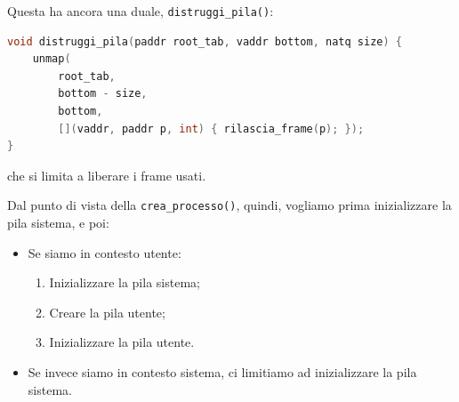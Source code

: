 \documentclass[a4paper,11pt]{article}
\begin{document}
Questa ha ancora una duale, \lstinline|distruggi_pila()|:
\begin{lstlisting}[language=C++, style=codestyle]	
void distruggi_pila(paddr root_tab, vaddr bottom, natq size) {
	unmap(
		root_tab,
		bottom - size,
		bottom,
		[](vaddr, paddr p, int) { rilascia_frame(p); });
}
\end{lstlisting}
che si limita a liberare i frame usati.

Dal punto di vista della \lstinline|crea_processo()|, quindi, vogliamo prima inizializzare la pila sistema, e poi:
\begin{itemize}
	\item Se siamo in contesto utente:
		\begin{enumerate}
			\item Inizializzare la pila sistema;
			\item Creare la pila utente;
			\item Inizializzare la pila utente.
		\end{enumerate}
	\item Se invece siamo in contesto sistema, ci limitiamo ad inizializzare la pila sistema.
\end{itemize}
\end{document}
